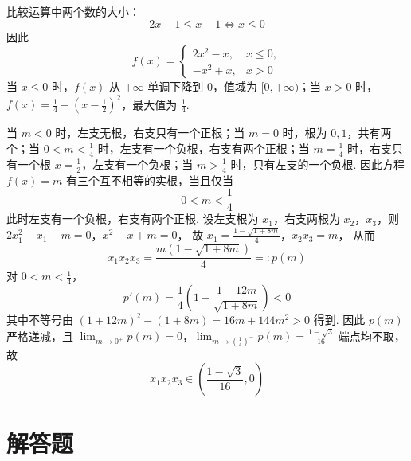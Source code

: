 \begin{solution}
比较运算中两个数的大小：
\[
2x-1\leqslant x-1\Longleftrightarrow x\leqslant0
\]
因此
\[
f(x)=\begin{cases}
2x^{2}-x,&x\leqslant0,\\
-x^{2}+x,&x>0
\end{cases}
\]
当 \(x\leqslant0\) 时，\(f(x)\) 从 \(+\infty\) 单调下降到 \(0\)，值域为 \([0,+\infty)\)；当 \(x>0\) 时，\(f(x)=\frac14-(x-\frac12)^{2}\)，最大值为 \(\frac14\).

当 \(m<0\) 时，左支无根，右支只有一个正根；当 \(m=0\) 时，根为 \(0,1\)，共有两个；当 \(0<m<\frac14\) 时，左支有一个负根，右支有两个正根；当 \(m=\frac14\) 时，右支只有一个根 \(x=\frac12\)，左支有一个负根；当 \(m>\frac14\) 时，只有左支的一个负根. 因此方程 \(f(x)=m\) 有三个互不相等的实根，当且仅当
\[
0<m<\frac14
\]
此时左支有一个负根，右支有两个正根. 设左支根为 \(x_{1}\)，右支两根为 \(x_{2}\)，\(x_{3}\)，则
\(2x_{1}^{2}-x_{1}-m=0\)，\(x^{2}-x+m=0\)，
故
\(x_{1}=\frac{1-\sqrt{1+8m}}{4}\)，\(x_{2}x_{3}=m\)，
从而
\[
x_{1}x_{2}x_{3}=\frac{m(1-\sqrt{1+8m})}{4}=:p(m)
\]
对 \(0<m<\frac14\)，
\[
p'(m)=\frac14\left(1-\frac{1+12m}{\sqrt{1+8m}}\right)<0
\]
其中不等号由 \((1+12m)^{2}-(1+8m)=16m+144m^{2}>0\) 得到. 因此 \(p(m)\) 严格递减，且
\(\lim_{m\to0^{+}}p(m)=0\)，\(\lim_{m\to(\frac{1}{4})^{-}}p(m)=\frac{1-\sqrt3}{16}\)
端点均不取，故
\[
x_{1}x_{2}x_{3}\in\left(\frac{1-\sqrt3}{16},0\right)
\]
\end{solution}

\section{解答题}

